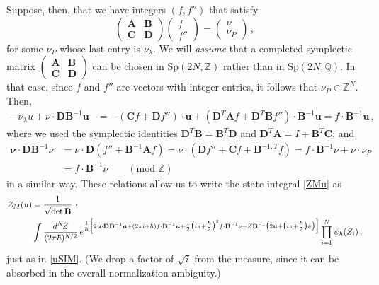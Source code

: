 \documentclass[12pt]{amsart}
\newcommand{\lbl}{\label}
\renewcommand{\eta}{\nu}
\theoremstyle{definition}
\def\BZ{\mathbb Z}
\def\BQ{\mathbb Q}
\def\be{  \begin{equation} }
\def\ee{  \end{equation} }
\def\Sp{\mathrm{Sp}}
\newcommand{\CZ}{\mathcal{Z}}
\newcommand{\Z}{\mathbb{Z}}
\newcommand{\mb}{\mathbf}
\numberwithin{equation}{section}
\begin{document}
Suppose, then, that we have integers $(f,f'')$ that satisfy
%
\be 
\lbl{eq.nuPinteger}
\begin{pmatrix} \mb A & \mb B \\ \mb C & \mb D \end{pmatrix}\begin{pmatrix} f \\ f'' \end{pmatrix} = \begin{pmatrix} \eta \\ \eta_P \end{pmatrix}\,, \ee 
%
for some $\eta_P$ whose last entry is $\eta_\lambda$. 
We will \emph{assume} that a completed symplectic matrix 
$\left(\begin{smallmatrix} \mb A & \mb B 
\\ \mb C & \mb D \end{smallmatrix}\right)$ can be chosen in $\Sp(2N,\Z)$ 
rather than in $\Sp(2N,\BQ)$. In that case, since $f$ and $f''$ are vectors
with integer entries, it follows that $\eta_P \in \BZ^N$. 
%
%
Then, 
%
\begin{align*} -\eta_\lambda u +\eta\cdot \mb D\mb B^{-1} \bm u  &=
 -(\mb Cf+\mb D f'')\cdot \bm u+(\mb D^T\mb Af+\mb D^T \mb B f'')\cdot \mb B^{-1}\bm u 
 = f\cdot\mb B^{-1}\bm u\,,
\end{align*}
%
where we used the symplectic identities $\mb D^T\mb B=\mb B^T\mb D$ and $\mb D^T\mb A=I+\mb B^T\mb C$; and
%
\begin{align*} \mb \eta \cdot \mb D\mb B^{-1}\eta &= \eta\cdot \mb D(f''+\mb B^{-1}\mb Af) = \eta\cdot (\mb Df''+\mb Cf+\mb B^{-1,T}f) = f\cdot \mb B^{-1}\eta +\nu\cdot \nu_P \\
&= f\cdot \mb B^{-1}\eta\qquad (\text{mod}\;\Z) \end{align*}
%
in a similar way. These relations allow us to write the state integral 
\eqref{ZMu} as
%
\be \label{appSIM}
\begin{split}
\hspace{-0in}\CZ_M(u) &= \frac{1}{\sqrt{\det\mb B}} \,\, \cdot \\
 & \int \frac{d^N\!Z}{(2\pi \hbar)^{N/2}}\, e^{\tfrac{1}{\hbar}\Big[2\bm u\cdot \mb D\mb B^{-1}\bm u+ (2\pi i+\hbar)f\cdot \mb B^{-1}\bm u+\tfrac12\big(i\pi+\tfrac\hbar2\big)^2f\cdot\mb B^{-1}\eta-Z\mb B^{-1}\big(2\bm u+\big(i\pi+\tfrac\hbar 2\big)\eta\big)\Big]} 
\prod_{i=1}^N\psi_\hbar(Z_i)\,,
\end{split}
\ee
%
just as in \eqref{uSIM}. (We drop a factor of $\sqrt i$ from the measure, since it can be absorbed in the overall normalization ambiguity.)
\end{document}
